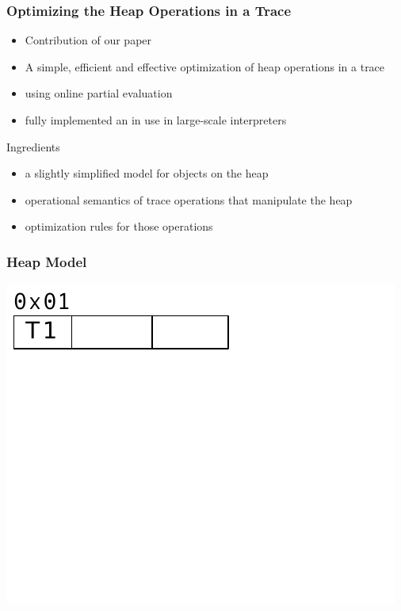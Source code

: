 \documentclass[utf8x]{beamer}
\begin{document}
\begin{frame}
  \frametitle{Optimizing the Heap Operations in a Trace}
  \begin{itemize}
      \item Contribution of our paper
      \item A simple, efficient and effective optimization of heap operations in a trace
      \item using online partial evaluation
      \item fully implemented an in use in large-scale interpreters
  \end{itemize}
  \pause
  \begin{block}{Ingredients}
      \begin{itemize}
          \item a slightly simplified model for objects on the heap
          \item operational semantics of trace operations that manipulate the heap
          \item optimization rules for those operations
      \end{itemize}
  \end{block}
\end{frame}

\begin{frame}
  \frametitle{Heap Model}
  \includegraphics[scale=0.9]{figures/heap01}
\end{frame}
\end{document}
